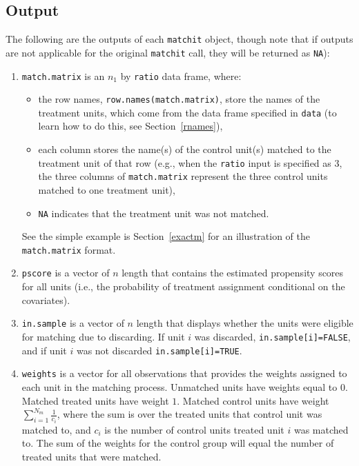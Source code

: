 \documentclass[oneside,letterpaper,titlepage]{article}
\begin{document}
\subsection{Output}

The following are the outputs of each \texttt{matchit} object, though
note that if outputs are not applicable for the original
\texttt{matchit} call, they will be returned as \texttt{NA}): 

\begin{enumerate}
  
\item \texttt{match.matrix} is an $n_1$ by \texttt{ratio} data frame,
  where:

  \begin{itemize}
  \item the row names, \texttt{row.names(match.matrix)}, store the
    names of the treatment units, which come from the data frame
    specified in \texttt{data} (to learn how to do this, see
    Section~\ref{rnames}),
  \item each column stores the name(s) of the control unit(s) matched
    to the treatment unit of that row (e.g., when the \texttt{ratio}
    input is specified as 3, the three columns of
    \texttt{match.matrix} represent the three control units matched to
    one treatment unit),
   \item \texttt{NA} indicates that the treatment unit was not
     matched.  
   \end{itemize}

See the simple example is Section~\ref{exactm} for an illustration of the
\texttt{match.matrix} format. 

\item \texttt{pscore} is a vector of $n$ length that contains the estimated propensity scores for
  all units (i.e., the probability of treatment assignment
  conditional on the covariates).

\item \texttt{in.sample} is a vector of $n$ length that
  displays whether the units were eligible for matching due to
  discarding.  If unit $i$ was discarded, \texttt{in.sample[i]=FALSE},
  and if unit $i$ was not discarded \texttt{in.sample[i]=TRUE}.

\item \texttt{weights} is a vector for all observations that provides
  the weights assigned to each unit in the 
  matching process.  Unmatched units have weights equal to $0$. Matched
  treated units have weight $1$.  Matched control units have weight $
  \sum_{i=1}^{N_m} \frac{1}{c_i} $, where the sum is over the treated
  units that control unit was matched
  to, and $c_i$ is the number of control units treated unit $i$
  was matched to.  The sum of the weights for the control group will equal 
  the number of treated units that were matched.  


\end{enumerate}
\end{document}
